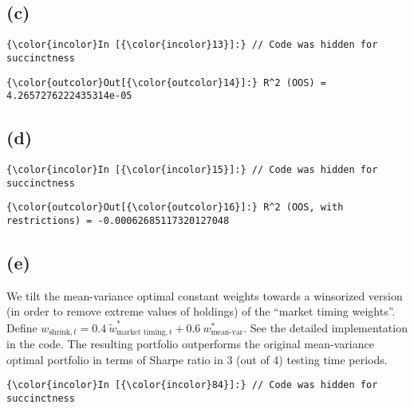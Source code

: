 \documentclass[11pt]{article}
\begin{document}
    \subsection{(c)}\label{c}

    \begin{Verbatim}[commandchars=\\\{\}]
{\color{incolor}In [{\color{incolor}13}]:} // Code was hidden for succinctness
\end{Verbatim}

            \begin{Verbatim}[commandchars=\\\{\}]
{\color{outcolor}Out[{\color{outcolor}14}]:} R^2 (OOS) = 4.2657276222435314e-05
\end{Verbatim}
        
    \subsection{(d)}\label{d}

    \begin{Verbatim}[commandchars=\\\{\}]
{\color{incolor}In [{\color{incolor}15}]:} // Code was hidden for succinctness
\end{Verbatim}


            \begin{Verbatim}[commandchars=\\\{\}]
{\color{outcolor}Out[{\color{outcolor}16}]:} R^2 (OOS, with restrictions) = -0.00062685117320127048
\end{Verbatim}
        
    \subsection{(e)}\label{e}
    We tilt the mean-variance optimal constant weights towards a winsorized version (in order to remove extreme values of holdings) of the ``market timing weights''. Define $w_{\text{shrink},t} = 0.4~\widetilde{w}^*_{\text{market timing},t} + 0.6~w^*_{\text{mean-var}}$. See the detailed implementation in the code. The resulting portfolio outperforms the original mean-variance optimal portfolio in terms of Sharpe ratio in 3 (out of 4) testing time periods.

    \begin{Verbatim}[commandchars=\\\{\}]
{\color{incolor}In [{\color{incolor}84}]:} // Code was hidden for succinctness
\end{Verbatim}
\end{document}
